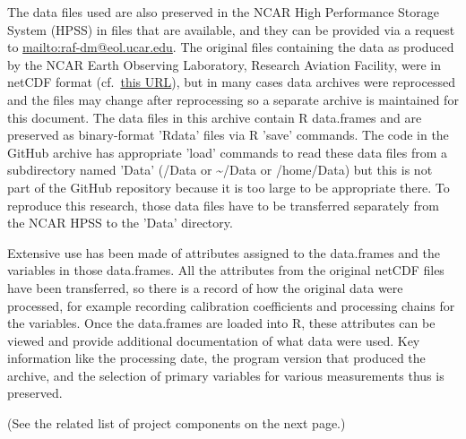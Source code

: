 \documentclass[12pt,twoside,english,12pt,twoside,english]{article}\usepackage[]{graphicx}\usepackage[]{color}
\let\OrgIndex\index
\renewcommand*{\index}[1]{\OrgIndex{#1}}
\begin{document}
The data files used are also preserved in the NCAR
High Performance Storage System (HPSS) in files
that are available, and they can be provided via a request
to \url{mailto:raf-dm@eol.ucar.edu}. The original files containing
the data as produced by the NCAR Earth Observing Laboratory, Research
Aviation Facility, were in netCDF format (cf.~\href{http://www.unidata.ucar.edu/software/netcdf/}{this URL}),
but in many cases data archives were reprocessed and the files may
change after reprocessing so a separate archive
is maintained for this document. The data files
in this archive contain R data.frames
and are preserved as binary-format 'Rdata' files via R 'save' commands.
The code in the GitHub archive has appropriate 'load' commands to
read these data files from a subdirectory named 'Data' (/Data or \textasciitilde{}/Data
or /home/Data) but this is not part of the GitHub repository because
it is too large to be appropriate there. To reproduce this research,
those data files have to be transferred separately from the NCAR HPSS
to the 'Data' directory.

Extensive use has been made of attributes
assigned to the data.frames and the variables in those data.frames.
All the attributes from the original netCDF files
have been transferred, so there is a record of how the original data
were processed, for example recording calibration
coefficients and processing chains for the variables. Once the data.frames
are loaded into R, these attributes can be viewed and provide additional
documentation of what data were used. Key information like the processing
date, the program version that produced the archive, and the selection
of primary variables for various measurements thus is preserved.

(See the related list of project components on the next page.)

\clearpage{}
\end{document}
